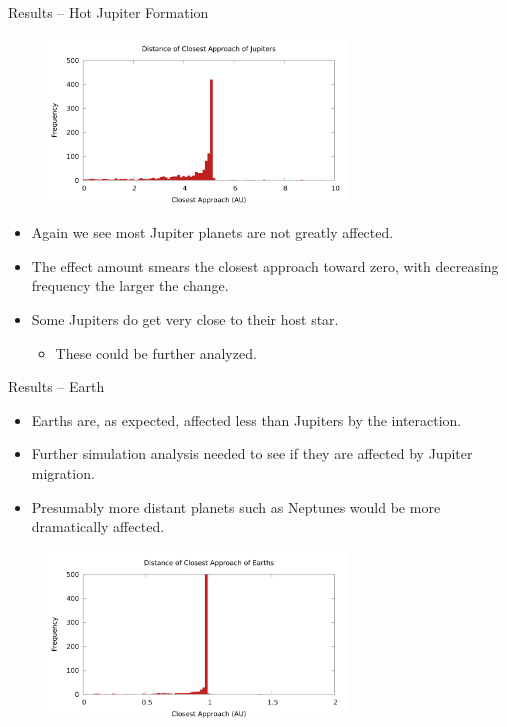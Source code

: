 \documentclass{beamer}
\begin{document}
\begin{frame}{Results -- Hot Jupiter Formation}
    \begin{figure}
        \centering
        \includegraphics[height=1.75in]{jupiter_distance_final}
    \end{figure}
    \begin{itemize}
        \item Again we see most Jupiter planets are not greatly affected.
        \item The effect amount smears the closest approach toward zero,
            with decreasing frequency the larger the change.
        \item Some Jupiters do get very close to their host star.
        \begin{itemize}
            \item These could be further analyzed.
        \end{itemize}
    \end{itemize}
\end{frame}

\begin{frame}{Results -- Earth}
    \begin{itemize}
        \item Earths are, as expected, affected less than Jupiters by the interaction.
        \item Further simulation analysis needed to see if they are affected by Jupiter
            migration.
        \item Presumably more distant planets such as Neptunes would be more dramatically
            affected.
    \end{itemize}
    \begin{figure}
        \centering
        \includegraphics[height=1.75in]{earth_distance_final}
    \end{figure}
\end{frame}
\end{document}
